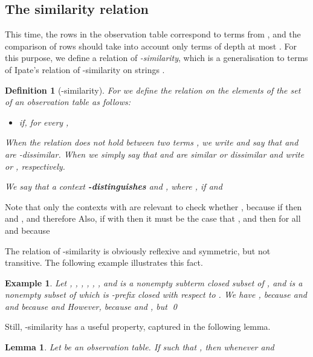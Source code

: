 \documentclass[preprint,12pt,english]{article}
\newtheorem{definition}{Definition}
\newtheorem{example}{Example}
\newtheorem{lemma}{Lemma}
\begin{document}
\subsection{The similarity relation}
This time, the rows in the observation table correspond to terms from , and the comparison of rows should take into account only terms of depth at most . For this purpose, we define a relation  of {\em -similarity}, which is a  generalisation to terms of Ipate's relation of -similarity on strings \cite{Ipate:2012}.
\begin{definition}[-similarity] 
For  we define the relation  on the elements of  the set  of an observation table  as follows:
\begin{itemize}
\item[]  if, for every ,  
\end{itemize}
When the relation  does not hold between two terms , we write  and say that  and  are {\em -dissimilar}. When   we simply say that  and  are {\em similar} or {\em dissimilar} and write  or , respectively.

We say that a context  {\bf -distinguishes}  and , where , if  and 
\end{definition}
Note that only the contexts  with  are relevant to check whether , because if  then  and , and therefore  Also, if  with  then it must be the case that , and then  for all  and  because 

The relation of -similarity is obviously reflexive and symmetric, but  not transitive. The following example illustrates this fact.
\begin{example}
Let , , ,   , , , and
  is a nonempty subterm closed subset of , and  is a nonempty subset of  which is -prefix closed with respect to . We have , 
 because  and  and
 because   and 
However,  because  and , but \qed
\end{example}
Still, -similarity has a useful property, captured in the following lemma.
\begin{lemma}
\label{lema1}
Let  be an observation table. If  such that , then  whenever  and 
\end{lemma}
\end{document}
